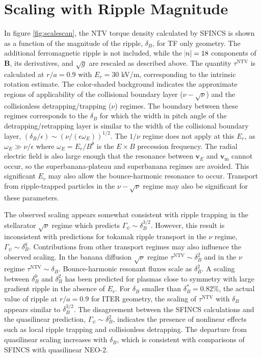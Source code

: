 \documentclass[aip, pop, preprint]{revtex4-1}
\begin{document}
\FloatBarrier

\section{Scaling with Ripple Magnitude}\label{scaling}
In figure \ref{fig:scalescan}, the NTV torque density calculated by SFINCS is shown as a function of the magnitude of the ripple, $\delta_B$, for TF only geometry. The additional ferromagnetic ripple is not included, while the $\abs{n}=18$ components of $\bm{B}$, its derivatives, and $\sqrt{g}$ are rescaled as described above. The quantity $\tau^{\mathrm{NTV}}$ is calculated at $r/a = 0.9$ with $E_r = 30$ kV/m, corresponding to the intrinsic rotation estimate. The color-shaded background indicates the approximate regions of applicability of the collisional boundary layer ($\nu-\sqrt{\nu}$) and the collisionless detrapping/trapping ($\nu$) regimes. The boundary between these regimes corresponds to the $\delta_B$ for which the width in pitch angle of the detrapping/retrapping layer is similar to the width of the collisional boundary layer, $(\delta_B/\epsilon) \sim (\nu/(\epsilon \omega_E))^{1/2}$. The $1/\nu$ regime \cite{Shaing2003} does not apply at this $E_r$, as $\omega_E \gg \nu/\epsilon$ where $\omega_E = E_r/B^{\theta}$ is the $E\times B$ precession frequency. The radial electric field is also large enough that the resonance between $\bm{v}_{E}$ and $\bm{v}_{\mathrm{m}}$ cannot occur, so the superbanana-plateau \cite{Shaing2009_sbp} and superbanana \cite{Shaing2009_sb} regimes are avoided. This significant $E_r$ may also allow the bounce-harmonic resonance to occur.\cite{Park2009} Transport from ripple-trapped particles in the $\nu- \sqrt{\nu}$ regime may also be significant for these parameters.

The observed scaling appears somewhat consistent with ripple trapping in the stellarator $\sqrt{\nu}$ regime \cite{Ho1987} which predicts $\Gamma_{\psi} \sim \delta_B^{3/2}$. However, this result is inconsistent with predictions for tokamak ripple transport in the $\nu$ regime, $\Gamma_{\psi} \sim \delta_B^0$.\cite{Tsang1977,Linsker1982} Contributions from other transport regimes may also influence the observed scaling. In the banana diffusion $\sqrt{\nu}$ regime $\tau^{\mathrm{NTV}} \sim \delta_B^2$ and in the $\nu$ regime $\tau^{\mathrm{NTV}} \sim \delta_B$. Bounce-harmonic resonant fluxes scale as $\delta_B^2$.\cite{Park2009} A scaling between $\delta_B^0$ and $\delta_B^{2}$ has been predicted for plasmas close to symmetry with large gradient ripple in the absence of $E_r$.\cite{Calvo2014} For $\delta_B$ smaller than $\delta_B^* = 0.82\%$, the actual value of ripple at $r/a=0.9$ for ITER geometry, the scaling of $\tau^{\mathrm{NTV}}$ with $\delta_B$ appears similar to $\delta_B^{3/2}$. The disagreement between the SFINCS calculations and the quasilinear prediction, $\Gamma_{\psi} \sim \delta_B^2$, indicates the presence of nonlinear effects such as local ripple trapping and collisionless detrapping. The departure from quasilinear scaling increases with $\delta_B$, which is consistent with comparisons of SFINCS with quasilinear NEO-2.\cite{Martitsch2016} 
\end{document}
